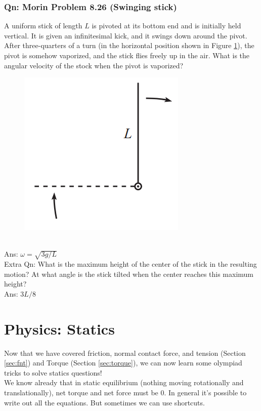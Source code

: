 \documentclass{article}
\begin{document}
\subsubsection{Qn: Morin Problem 8.26 (Swinging stick)}
A uniform stick of length $L$ is pivoted at its bottom end and is initially held vertical. It is given an infinitesimal kick, and it swings down around the pivot. After three-quarters of a turn (in the horizontal position shown in Figure \ref{fig:morin8.26}), the pivot is somehow vaporized, and the stick flies freely up in the air. What is the angular velocity of the stock when the pivot is vaporized? 
\begin{figure} 
\includegraphics[width=\linewidth]{images/morin8.26.png}
\label{fig:morin8.26}
\end{figure}\\
Ans: $\omega = \sqrt{3g/L}$\\[5pt]
Extra Qn: What is the maximum height of the center of the stick in the resulting motion? At what angle is the stick tilted when the center reaches this maximum height? \\[5pt]
Ans: $3L/8$
\newpage\clearpage 
\section{Physics: Statics}
Now that we have covered friction, normal contact force, and tension (Section \ref{sec:fnt}) and Torque (Section \ref{sec:torque}), we can now learn some olympiad tricks to solve statics questions!\\[10pt]
We know already that in static equilibrium (nothing moving rotationally and translationally), net torque and net force must be 0. In general it's possible to write out all the equations. But sometimes we can use shortcuts.
\end{document}
